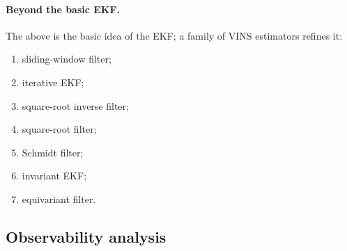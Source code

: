 \paragraph{Beyond the basic EKF.} The above is the basic idea of the EKF; a family of VINS estimators refines it:
\begin{enumerate}[noitemsep,topsep=2pt]
\item sliding-window filter;
\item iterative EKF;
\item square-root inverse filter;
\item square-root filter;
\item Schmidt filter;
\item invariant EKF;
\item equivariant filter.
\end{enumerate}

\subsection{Observability analysis}
\label{sec:lec06-observability}

